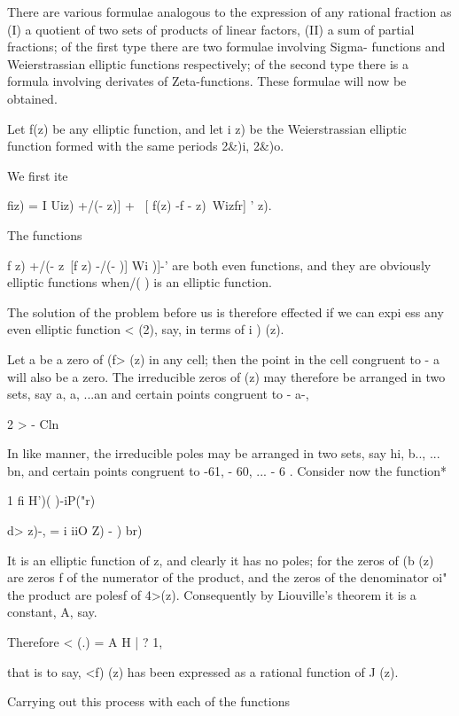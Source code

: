 {There are various formulae analogous to the expression of any rational
fraction as (I) a quotient of two sets of products of linear factors,
(II) a sum of partial fractions; of the first type there are two
formulae involving Sigma- functions and Weierstrassian elliptic
functions respectively; of the second type there is a formula
involving derivates of Zeta-functions. These formulae will now be
obtained.


Let f(z) be any elliptic function, and let i z) be the Weierstrassian
elliptic function formed with the same periods 2\&)i, 2\&)o.

We first ite

fiz) = I Uiz) +/(- z)] + \ [ f(z) -f - z)\ Wizfr] ' z).

%
%

The functions

f z) +/(- z\ [f z) -/(- )] Wi )]-' are both even functions, and they
are obviously elliptic functions when/( ) is an elliptic function.

The solution of the problem before us is therefore effected if we can
expi ess any even elliptic function < (2), say, in terms of i ) (z).

Let a be a zero of (f> (z) in any cell; then the point in the cell
congruent to - a will also be a zero. The irreducible zeros of (z) may
therefore be arranged in two sets, say a, a, ...an and certain
points congruent to - a-,

 2 >    - Cln 

In like manner, the irreducible poles may be arranged in two sets, say
hi, b.., ... bn, and certain points congruent to -61, - 60, ... - 6 .
Consider now the function*

1 fi H')( )-iP("r)

d> z)-, = i iiO Z) - ) br)

It is an elliptic function of z, and clearly it has no poles; for the
zeros of (b (z) are zeros f of the numerator of the product, and the
zeros of the denominator oi" the product are polesf of 4>(z).
Consequently by Liouville's theorem it is a constant, A, say.

Therefore < (.) = A H | ? 1,

that is to say, <f) (z) has been expressed as a rational function of J
(z).

Carrying out this process with each of the functions

}
